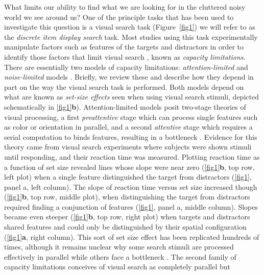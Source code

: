 \documentclass[10pt,letterpaper]{article}
\begin{document}
What limits our ability to find what we are looking for in the cluttered noisy world we 
see around us? One of the principle tasks that has been used to investigate this question 
is a visual search task (Figure~\ref{fig1}) \cite{wolfeVisualSearch1998}
we will refer to as the \emph{discrete item display search} task. 
Most studies using this task experimentally manipulate factors such as features of the targets and 
distractors in order to identify those factors that limit visual search 
\cite{ecksteinVisualSearchRetrospective2011,wolfeFiveFactorsThat2017}, known as 
\emph{capacity limitations}. There are essentially two models of capacity limitations: 
\emph{attention-limited} and \emph{noise-limited} models \cite{palmerSignalDetectionEvidence2011}. 
Briefly, we review these and describe how they depend in part on the 
way the visual search task is performed. Both models 
depend on what are known as \emph{set-size effects} seen when using visual search stimuli, 
depicted schematically in \ref{fig1}\textbf{b}).
Attention-limited models posit two-stage theories of visual processing, a first 
\emph{preattentive} stage which can process single features such as color or orientation 
in parallel, and a second \emph{attentive} stage which requires a serial computation to 
binds features, resulting in a bottleneck 
\cite{treismanFeatureintegrationTheoryAttention1980,wolfeGuidedSearchAlternative1989,wolfeGuidedSearchRevised1994}. 
Evidence for this theory came from visual search 
experiments where subjects were shown stimuli until responding, and their reaction time 
was measured. Plotting reaction time as a function of set size revealed 
lines whose slope were near zero (\ref{fig1}\textbf{b}, top row, left plot) 
when a single feature distinguished the target from 
distractors (\ref{fig1}, panel a, left column). 
The slope of reaction time versus set size increased though (\ref{fig1}\textbf{b}, top row, middle plot), 
when distinguishing the target from distractors required finding a 
conjunction of features (\ref{fig1}, panel a, middle column). Slopes became 
even steeper (\ref{fig1}\textbf{b}, top row, right plot) 
when targets and distractors shared features and could only be 
distinguished by their spatial configuration (\ref{fig1}\textbf{a}, right column). 
This sort of set size effect has been replicated hundreds of times, although it remains 
unclear why some search stimuli are processed effectively in parallel while others 
face a bottleneck \cite{wolfeWhatCanMillion1998,wolfeFiveFactorsThat2017}.
The second family of capacity limitations conceives of visual search as completely parallel but 
\end{document}
